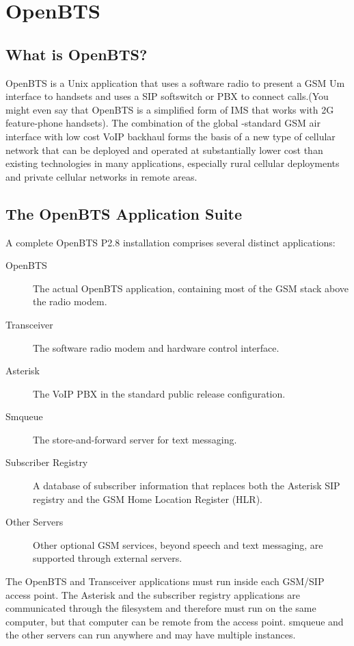 \chapter{OpenBTS}

\section{What is OpenBTS?}
OpenBTS is a Unix application that uses a software radio to present a GSM Um interface to handsets and uses a SIP softswitch or PBX to connect calls.(You might even say that OpenBTS is a simplified form of IMS that works with 2G feature-phone handsets). The combination of the global -standard GSM air interface with low cost VoIP backhaul forms the basis of a new type of cellular network that can be deployed and operated at substantially lower cost than existing technologies in many applications, especially rural cellular deployments and private cellular networks in remote areas.

\section{The OpenBTS Application Suite}
A complete OpenBTS P2.8 installation comprises several distinct applications:

\begin{description}
\item[OpenBTS] The actual OpenBTS application, containing most of the GSM stack above the radio modem.
\item[Transceiver] The software radio modem and hardware control interface.
\item[Asterisk] The VoIP PBX in the standard public release configuration.
\item[Smqueue] The store-and-forward server for text messaging.
\item[Subscriber Registry] A database of subscriber information that replaces both the Asterisk SIP registry and the GSM Home Location Register (HLR).
\item[Other Servers] Other optional GSM services, beyond speech and text messaging, are supported through external servers.
\end{description}

The OpenBTS and Transceiver applications must run inside each GSM/SIP access point. The Asterisk and the subscriber registry applications are communicated through the filesystem and therefore must run on the same computer, but that computer can be remote from the access point. smqueue and the other servers can run anywhere and may have multiple instances.

